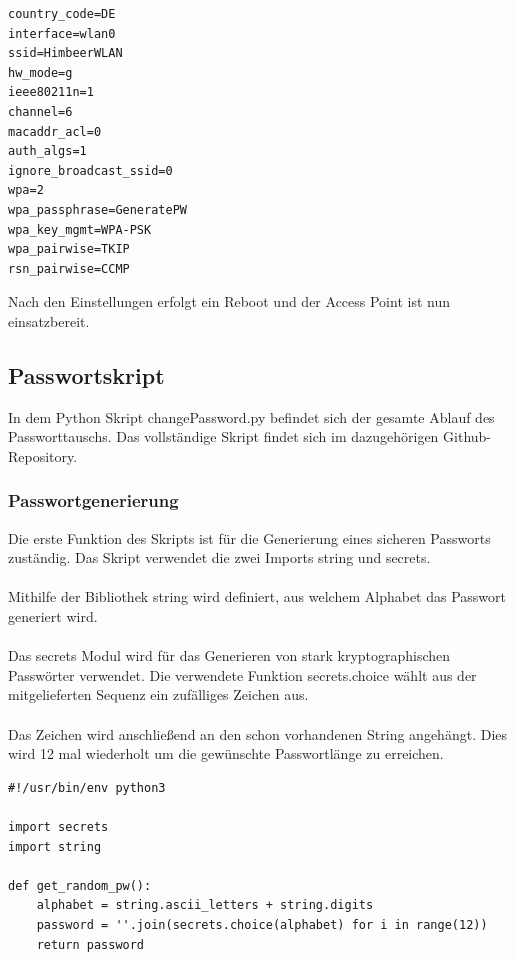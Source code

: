 \documentclass[a4paper,11pt,singlespacing]{article}
\begin{document}
                
                    \begin{lstlisting}
country_code=DE
interface=wlan0
ssid=HimbeerWLAN
hw_mode=g
ieee80211n=1
channel=6
macaddr_acl=0
auth_algs=1
ignore_broadcast_ssid=0
wpa=2
wpa_passphrase=GeneratePW
wpa_key_mgmt=WPA-PSK
wpa_pairwise=TKIP
rsn_pairwise=CCMP
                    \end{lstlisting} 
                   
                   Nach den Einstellungen erfolgt ein Reboot und der Access Point ist nun einsatzbereit.
                
     \subsection{Passwortskript}           
            In dem Python Skript changePassword.py befindet sich der gesamte Ablauf des Passworttauschs.  Das vollständige Skript findet sich im dazugehörigen Github-Repository.\cite{Quote_github_repo}
            
    	\subsubsection{Passwortgenerierung}
    		Die erste Funktion des Skripts ist für die Generierung eines sicheren Passworts zuständig. Das Skript verwendet die zwei Imports string und secrets. \\ \\
    		Mithilfe der Bibliothek string wird definiert, aus welchem Alphabet das Passwort generiert wird.\\ \\			
    		Das secrets Modul wird für das Generieren von stark kryptographischen Passwörter verwendet. Die verwendete Funktion secrets.choice wählt aus der mitgelieferten Sequenz ein zufälliges Zeichen aus. \\ \\
    		Das Zeichen wird anschließend an den schon vorhandenen String angehängt. Dies wird 12 mal wiederholt um die gewünschte Passwortlänge zu erreichen.
    	
    	

\begin{lstlisting}            
#!/usr/bin/env python3

import secrets
import string

def get_random_pw():
	alphabet = string.ascii_letters + string.digits
	password = ''.join(secrets.choice(alphabet) for i in range(12))
	return password
	
\end{lstlisting}
    	
\end{document}
